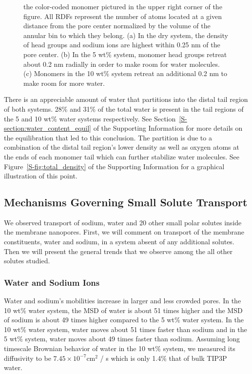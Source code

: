 \documentclass[journal=jpcbfk,manuscript=article]{achemso}
\begin{document}
\begin{figure}[!htb]
{  the color-coded monomer pictured in the upper right corner of the figure. 
  All RDFs represent the number of atoms located at a given distance from the
  pore center normalized by the volume of the annular bin to which they belong.
  (a) In the dry system, the density of head groups and sodium ions are highest
  within 0.25 nm of the pore center. (b) In the 5 wt\% system, monomer head 
  groups retreat about 0.2 nm radially in order to make room for water molecules.
  (c) Monomers in the 10 wt\% system retreat an additional 0.2 nm to make room
  for more water.}\label{fig:component_densities}
  \end{figure}
  
  There is an appreciable amount of water that partitions into the distal tail %
  region of both systems. 28\% and 31\% of the total water is present in the
  tail regions of the 5 and 10 wt\% water systems respectively. See 
  Section~\ref{S-section:water_content_equil} of the Supporting Information 
  for more details on the equilibration that led to this conclusion. The partition
  is due to a combination of the distal tail region's lower density as well
  as oxygen atoms at the ends of each monomer tail which can further stabilize
  water molecules. See Figure~\ref{S-fig:total_density} of the Supporting 
  Information for a graphical illustration of this point.

  \subsection{Mechanisms Governing Small Solute Transport}\label{section:mechanism_overview} 

  We observed transport of sodium, water and 20 other small polar solutes
  inside the membrane nanopores. First, we will comment on transport of the
  membrane constituents, water and sodium, in a system absent of any additional
  solutes. Then we will present the general trends that we observe among the
  all other solutes studied.
  
  \subsubsection{Water and Sodium Ions}\label{section:transport_water_sodium} 

  Water and sodium's mobilities increase in larger and less crowded pores. 
  In the 10 wt\% water system, the MSD of water is about 51 times higher and
  the MSD of sodium is about 49 times higher compared to the 5 wt\% water system. 
  In the 10 wt\% water system, water moves about 51 times faster than sodium 
  and in the 5 wt\% system, water moves about 49 times faster than sodium. Assuming
  long timescale Brownian behavior of water in the 10 wt\% system, we measured its
  diffusivity to be $7.45 \times 10^{-7}$cm$^2$ / s which is only 1.4\% that of bulk TIP3P 
  water.~\cite{mahoney_diffusion_2000} %
  
\end{document}
